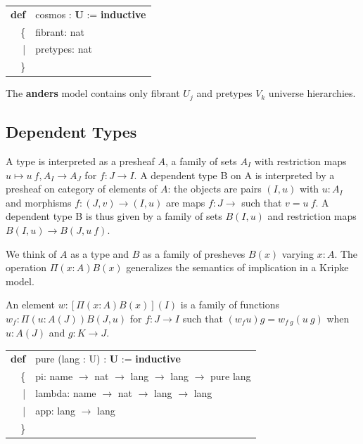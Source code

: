 \documentclass[a4paper,UKenglish,cleveref, autoref, thm-restate]{lipics-v2021}
\newcommand{\tabstyle}[0]{\scriptsize\ttfamily\fontseries{l}\selectfont}
\begin{document}
\begin{table}[ht!]
\tabstyle
\begin{tabular}{rl}
     \textbf{def} & cosmos : \textbf{U} := \textbf{inductive} \\
               \{ & fibrant: nat \\
               |  & pretypes: nat \\
               \} & \\
\end{tabular}
\end{table}

The \textbf{anders} model contains only fibrant $U_j$ and pretypes $V_k$ universe hierarchies.

\newpage

\subsection{Dependent Types}

\begin{definition}[Type]
A type is interpreted as a presheaf $A$, a family of sets $A_I$ with restriction maps
$u \mapsto u\ f, A_I \rightarrow A_J$ for $f: J\rightarrow I$. A dependent type
B on A is interpreted by a presheaf on category of elements of $A$: the objects
are pairs $(I,u)$ with $u : A_I$ and morphisms $f: (J,v) \rightarrow (I,u)$ are
maps $f : J \rightarrow$ such that $v = u\ f$. A dependent type B is thus given
by a family of sets $B(I,u)$ and restriction maps $B(I,u) \rightarrow B(J,u\ f)$.
\end{definition}


We think of $A$ as a type and $B$ as a family of presheves $B(x)$ varying $x:A$.
The operation $\Pi(x:A)B(x)$ generalizes the semantics of
implication in a Kripke model.

\begin{definition}[Pi]
An element $w:[\Pi(x:A)B(x)](I)$ is a family of functions $w_f : \Pi(u:A(J))B(J,u)$
for $f : J \rightarrow I$ such that $(w_f u)g=w_{f\ g}(u\ g)$ when $u:A(J)$ and $g:K\rightarrow J$.
\end{definition}
\begin{table}[ht!]
\tabstyle
\begin{tabular}{rl}
  \textbf{def} & pure (lang : U) : \textbf{U} := \textbf{inductive} \\
            \{ & pi: name $\rightarrow$ nat $\rightarrow$ lang $\rightarrow$ lang $\rightarrow$ pure lang \\
             | & lambda: name $\rightarrow$ nat $\rightarrow$ lang $\rightarrow$ lang \\
             | & app: lang $\rightarrow$ lang \\
            \} & \\
\end{tabular}
\end{table}
\end{document}
